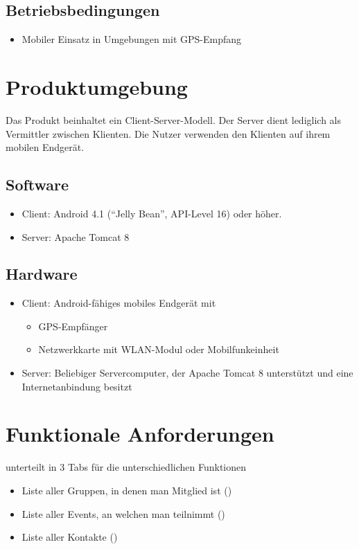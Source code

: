 \documentclass[parskip=full,11pt]{scrartcl}
\begin{document}
\subsection{Betriebsbedingungen}
\begin{itemize}
    \item Mobiler Einsatz in Umgebungen mit GPS-Empfang
\end{itemize}

\section{Produktumgebung}
Das Produkt beinhaltet ein Client-Server-Modell.
Der Server dient lediglich als Vermittler zwischen Klienten.
Die Nutzer verwenden den Klienten auf ihrem mobilen Endgerät.
\subsection{Software}
\begin{itemize}
    \item Client: Android 4.1 (\enquote{Jelly Bean}, API-Level 16) oder
        höher.
    \item Server: Apache Tomcat 8
\end{itemize}

\subsection{Hardware}
\begin{itemize}
    \item Client: Android-fähiges mobiles Endgerät mit
        \begin{itemize}
            \item GPS-Empfänger
            \item Netzwerkkarte mit WLAN-Modul oder Mobilfunkeinheit
        \end{itemize}
    \item Server: Beliebiger Servercomputer, der Apache Tomcat 8 unterstützt
        und eine Internetanbindung besitzt
\end{itemize}

\section{Funktionale Anforderungen}

unterteilt in 3 Tabs für die unterschiedlichen Funktionen
\begin{itemize}
    \item Liste aller Gruppen, in denen man Mitglied ist ()
    \item Liste aller Events, an welchen man teilnimmt ()
    \item Liste aller Kontakte ()
\end{itemize}
\end{document}
